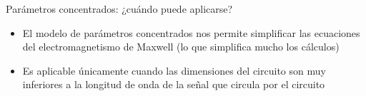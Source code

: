 \documentclass[aspectratio=169, xcolor={usenames,svgnames,dvipsnames}]{beamer}
\begin{document}

\begin{frame}{Parámetros concentrados: \hspace{5mm} ¿cuándo puede aplicarse?}

    \begin{itemize}
        \item El modelo de parámetros concentrados nos permite simplificar las ecuaciones del electromagnetismo de Maxwell (lo que \alert{simplifica mucho los cálculos})
        \vspace{2mm}
        \item Es aplicable únicamente cuando \alert{las dimensiones del circuito son muy inferiores a la longitud de onda} de la señal que circula por el circuito
        \vspace{5mm}
    \end{itemize}


\end{frame}
\end{document}
